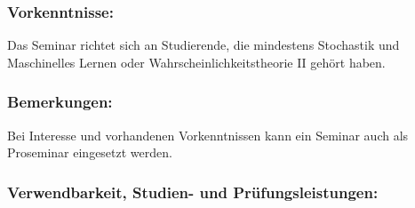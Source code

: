 \documentclass[a4paper,10pt]{article}
\begin{document}
\subsubsection*{\large
    Vorkenntnisse:
}
Das Seminar richtet sich an Studierende, die mindestens Stochastik und Maschinelles Lernen oder Wahrscheinlichkeitstheorie II gehört haben.
\subsubsection*{\large
    Bemerkungen:
}
Bei Interesse und vorhandenen Vorkenntnissen kann ein Seminar auch als Proseminar eingesetzt werden.
\subsubsection*{\large
    Verwendbarkeit, Studien- und Prüfungsleistungen:
}
\end{document}
